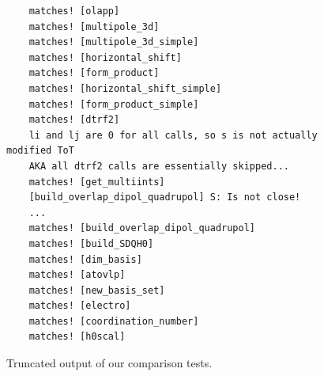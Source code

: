 \begin{figure}[H]
\begin{verbatim}
    matches! [olapp]
    matches! [multipole_3d]
    matches! [multipole_3d_simple]
    matches! [horizontal_shift]
    matches! [form_product]
    matches! [horizontal_shift_simple]
    matches! [form_product_simple]
    matches! [dtrf2]
    li and lj are 0 for all calls, so s is not actually modified ToT
    AKA all dtrf2 calls are essentially skipped...
    matches! [get_multiints]
    [build_overlap_dipol_quadrupol] S: Is not close!
    ...
    matches! [build_overlap_dipol_quadrupol]
    matches! [build_SDQH0]
    matches! [dim_basis]
    matches! [atovlp]
    matches! [new_basis_set]
    matches! [electro]
    matches! [coordination_number]
    matches! [h0scal]
\end{verbatim}
\caption{Truncated output of our comparison tests.}
\label{fig:tests-output}
\end{figure}


